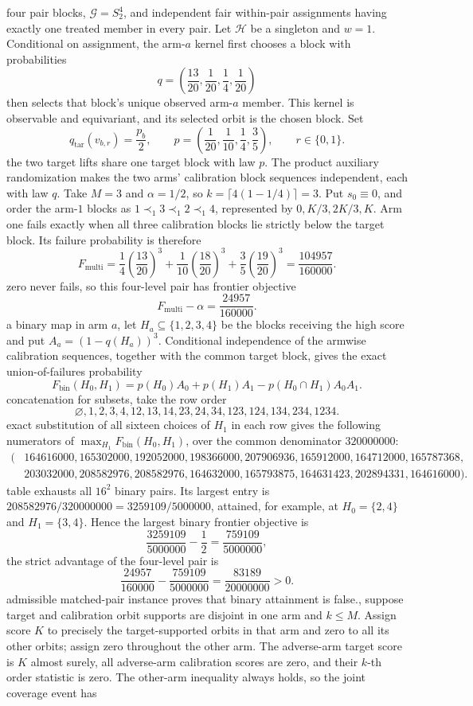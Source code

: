four pair blocks, \(\mathcal G=S_2^4\), and independent fair within-pair assignments having exactly one treated member in every pair. Let \(\mathcal H\) be a singleton and \(w=1\). Conditional on assignment, the arm-\(a\) kernel first chooses a block with probabilities\n\[q=\left(\frac{13}{20},\frac1{20},\frac14,\frac1{20}\right)\]\nand then selects that block's unique observed arm-\(a\) member. This kernel is observable and equivariant, and its selected orbit is the chosen block. Set\n\[q_{\mathrm{tar}}(v_{b,r})=\frac{p_b}{2},\qquad p=\left(\frac1{20},\frac1{10},\frac14,\frac35\right),\qquad r\in\{0,1\}.\]\nThus the two target lifts share one target block with law \(p\). The product auxiliary randomization makes the two arms' calibration block sequences independent, each with law \(q\). Take \(M=3\) and \(\alpha=1/2\), so \(k=\lceil4(1-1/4)\rceil=3\). Put \(s_0\equiv0\), and order the arm-\(1\) blocks as \(1\prec_1 3\prec_1 2\prec_1 4\), represented by \(0,K/3,2K/3,K\). Arm one fails exactly when all three calibration blocks lie strictly below the target block. Its failure probability is therefore\n\[F_{\mathrm{multi}}=\frac14\left(\frac{13}{20}\right)^3+\frac1{10}\left(\frac{18}{20}\right)^3+\frac35\left(\frac{19}{20}\right)^3=\frac{104957}{160000}.\]\nArm zero never fails, so this four-level pair has frontier objective\n\[F_{\mathrm{multi}}-\alpha=\frac{24957}{160000}.\]\nFor a binary map in arm \(a\), let \(H_a\subseteq\{1,2,3,4\}\) be the blocks receiving the high score and put \(A_a=(1-q(H_a))^3\). Conditional independence of the armwise calibration sequences, together with the common target block, gives the exact union-of-failures probability\n\[F_{\mathrm{bin}}(H_0,H_1)=p(H_0)A_0+p(H_1)A_1-p(H_0\cap H_1)A_0A_1.\]\nUsing concatenation for subsets, take the row order\n\[\varnothing,1,2,3,4,12,13,14,23,24,34,123,124,134,234,1234.\]\nDirect exact substitution of all sixteen choices of \(H_1\) in each row gives the following numerators of \(\max_{H_1}F_{\mathrm{bin}}(H_0,H_1)\), over the common denominator \(320000000\):\n\[\begin{split}(&164616000,165302000,192052000,198366000,207906936,165912000,164712000,165787368,\\&203032000,208582976,208582976,164632000,165793875,164631423,202894331,164616000).\end{split}\]\nThis table exhausts all \(16^2\) binary pairs. Its largest entry is \(208582976/320000000=3259109/5000000\), attained, for example, at \(H_0=\{2,4\}\) and \(H_1=\{3,4\}\). Hence the largest binary frontier objective is\n\[\frac{3259109}{5000000}-\frac12=\frac{759109}{5000000},\]\nand the strict advantage of the four-level pair is\n\[\frac{24957}{160000}-\frac{759109}{5000000}=\frac{83189}{20000000}>0.\]\nThis admissible matched-pair instance proves that binary attainment is false.\n\nFinally, suppose target and calibration orbit supports are disjoint in one arm and \(k\le M\). Assign score \(K\) to precisely the target-supported orbits in that arm and zero to all its other orbits; assign zero throughout the other arm. The adverse-arm target score is \(K\) almost surely, all adverse-arm calibration scores are zero, and their \(k\)-th order statistic is zero. The other-arm inequality always holds, so the joint coverage event has 
